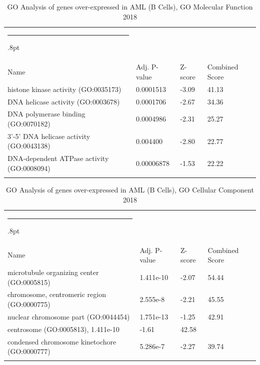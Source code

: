 \documentclass[3p,authoryear,preprint,12pt]{elsarticle}
\makeatletter
\def\hlinewd#1{%
  \noalign{\ifnum0=`}\fi\hrule \@height #1%
  \futurelet\reserved@a\@xhline}
\def\tbltoprule{\hlinewd{.8pt}\\[-12pt]}
\def\tblbottomrule{\noalign{\vspace*{6pt}}\hline\noalign{\vspace*{2pt}}}
\def\tblmidrule{\noalign{\vspace*{6pt}}\hline\noalign{\vspace*{2pt}}}
\makeatother
\begin{document}
\begin{table}[!htbp]
	\caption{{GO Analysis of genes over-expressed in AML (B Cells), GO Molecular Function 2018} }
	\label{tw-de478ae31tc6}
	\def\arraystretch{1}
	\ignorespaces 
	\centering 
	\begin{tabulary}{\linewidth}{p{\dimexpr.65\tabcolsep}p{\dimexpr.15\tabcolsep}p{\dimexpr.1\tabcolsep}p{\dimexpr.1\tabcolsep}}
		\tbltoprule Name & Adj. P-value & Z-score & Combined Score\\
		\tblmidrule
histone kinase activity (GO:0035173) & 0.0001513 & -3.09 & 41.13 \\
DNA helicase activity (GO:0003678) & 0.0001706 & -2.67 & 34.36 \\
DNA polymerase binding (GO:0070182) & 0.0004986 & -2.31 & 25.27 \\
3'-5' DNA helicase activity (GO:0043138) & 0.004400 & -2.80 & 22.77 \\
DNA-dependent ATPase activity (GO:0008094) & 0.00006878 & -1.53 & 22.22 \\
		\tblbottomrule
	\end{tabulary}\par 
\end{table}
\begin{table}[!htbp]
	\caption{{GO Analysis of genes over-expressed in AML (B Cells), GO Cellular Component 2018} }
	\label{tw-de478ae31uc6}
	\def\arraystretch{1}
	\ignorespaces 
	\centering 
	\begin{tabulary}{\linewidth}{p{\dimexpr.65\tabcolsep}p{\dimexpr.15\tabcolsep}p{\dimexpr.1\tabcolsep}p{\dimexpr.1\tabcolsep}}
		\tbltoprule Name & Adj. P-value & Z-score & Combined Score\\
		\tblmidrule
microtubule organizing center (GO:0005815) & 1.411e-10 & -2.07 & 54.44 \\
chromosome, centromeric region (GO:0000775) & 2.555e-8 & -2.21 & 45.55 \\
nuclear chromosome part (GO:0044454) & 1.751e-13 & -1.25 & 42.91 \\
centrosome (GO:0005813), 1.411e-10 & -1.61 & 42.58 \\
condensed chromosome kinetochore (GO:0000777) & 5.286e-7 & -2.27 & 39.74 \\
		\tblbottomrule
	\end{tabulary}\par 
\end{table}
\end{document}
